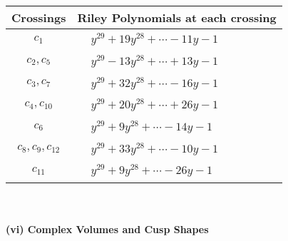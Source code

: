 \documentclass[1p]{elsarticle_modified}
\theoremstyle{definition}
\begin{document}
\begin{tabular}{m{50pt}|m{274pt}}
Crossings & \hspace{64pt}Riley Polynomials at each crossing \\
\hline $$\begin{aligned}c_{1}\end{aligned}$$&$\begin{aligned}
&y^{29}+19 y^{28}+\cdots-11 y-1
\end{aligned}$\\
\hline $$\begin{aligned}c_{2},c_{5}\end{aligned}$$&$\begin{aligned}
&y^{29}-13 y^{28}+\cdots+13 y-1
\end{aligned}$\\
\hline $$\begin{aligned}c_{3},c_{7}\end{aligned}$$&$\begin{aligned}
&y^{29}+32 y^{28}+\cdots-16 y-1
\end{aligned}$\\
\hline $$\begin{aligned}c_{4},c_{10}\end{aligned}$$&$\begin{aligned}
&y^{29}+20 y^{28}+\cdots+26 y-1
\end{aligned}$\\
\hline $$\begin{aligned}c_{6}\end{aligned}$$&$\begin{aligned}
&y^{29}+9 y^{28}+\cdots-14 y-1
\end{aligned}$\\
\hline $$\begin{aligned}c_{8},c_{9},c_{12}\end{aligned}$$&$\begin{aligned}
&y^{29}+33 y^{28}+\cdots-10 y-1
\end{aligned}$\\
\hline $$\begin{aligned}c_{11}\end{aligned}$$&$\begin{aligned}
&y^{29}+9 y^{28}+\cdots-26 y-1
\end{aligned}$\\
\hline
\end{tabular}\\~\\
\newpage\flushleft \textbf{(vi) Complex Volumes and Cusp Shapes}
\end{document}
